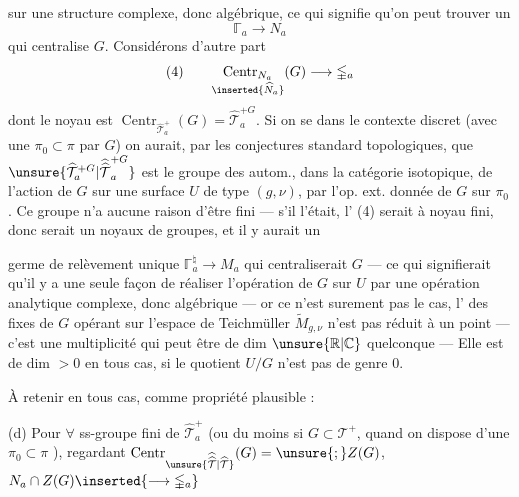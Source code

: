 
sur une structure complexe, donc algébrique, ce qui signifie qu'on peut trouver un  
\[
\mathbb{\Gamma}_a\longrightarrow N_a
\]
qui centralise $G$. Considérons d'autre part
\[
(4)\qquad
\underset{\inserted{\widehat N_a}}{\operatorname{Centr}_{N_a}}(G)
\longrightarrow\mathbb{\Gamma}_a
\]
dont le noyau est $\operatorname{Centr}_{\widehat{\mathcal T}_a^+}(G)=\widehat{\mathcal T}_a^{+G}$.
Si on se  dans le contexte discret  (avec une  $\pi_0\subset\pi$  par $G$) on aurait, par les conjectures standard topologiques, que $\unsure{\widehat{\mathcal T}_a^{+G}|\widehat{\widehat{\mathcal T}}_a^{+G}}$ est le groupe des autom., dans la catégorie isotopique, de l'action de $G$ sur une surface $U$ de type $(g,\nu)$,  par l'op. ext. donnée de $G$ sur $\pi_0$. Ce groupe n'a aucune raison d'être fini --- s'il l'était, l' (4) serait à noyau fini, donc serait un   noyaux de groupes, et il y aurait un


germe de relèvement unique $\mathbb{\Gamma}_a^{\natural}\longrightarrow M_a$ qui centraliserait $G$ --- ce qui signifierait qu'il y a  une seule façon de réaliser l'opération  de $G$ sur $U$ par une opération  analytique complexe, donc algébrique --- or ce n'est surement pas le cas, l' des  fixes de $G$ opérant sur l'espace de Teichmüller $\widetilde M_{g,\nu}$ n'est pas réduit à un point --- c'est  une multiplicité  qui peut être  de dim $\unsure{\mathbb R|\mathbb C}$ quelconque --- Elle est de dim $>0$ en tous cas, si le quotient  $U/G$ n'est pas de genre $0$.

À retenir en tous cas, comme propriété plausible :

(d) Pour $\forall$ ss-groupe fini  de $\widehat{\mathcal T}_a^+$ (ou du moins si $G\subset\mathcal T^+$, quand on dispose d'une  $\pi_0\subset\pi$ ), regardant $\operatorname{Centr}_{\unsure{\widehat{\widehat{\mathcal T}}|\widehat{\mathcal T}}}(G)=\unsure{;}Z(G)$, $N_a\cap Z(G)\inserted{\longrightarrow\mathbb{\Gamma}_a}$  

